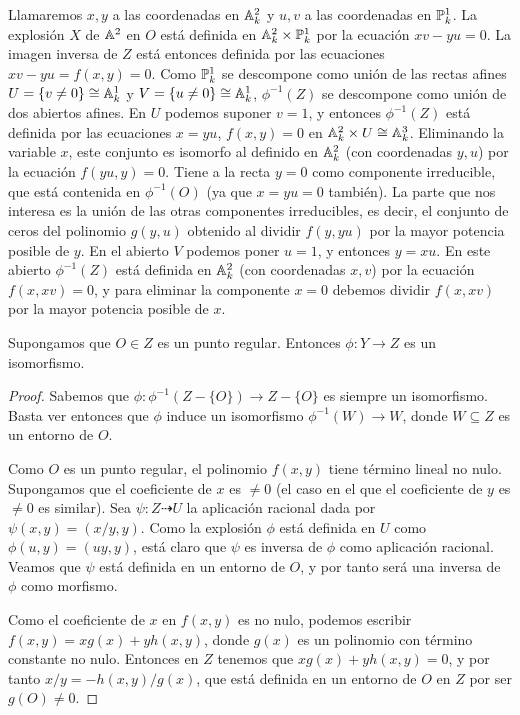 \documentclass[ACGA.tex]{subfiles}
\begin{document}
Llamaremos $x,y$ a las coordenadas en $\mathbb{A}^2_k$ y $u,v$ a las coordenadas en $\mathbb{P}^1_k$. La explosión $X$ de $\mathbb{A}^2$ en $O$ está definida en $\mathbb{A}^2_k\times\mathbb{P}^1_k$ por la ecuación $xv-yu=0$. La imagen inversa de $Z$ está entonces definida por las ecuaciones $xv-yu=f(x,y)=0$. Como $\mathbb{P}^1_k$ se descompone como unión de las rectas afines $U=\{v\neq 0\}\cong\mathbb{A}^1_k$ y $V=\{u\neq 0\}\cong\mathbb{A}^1_k$, $\phi^{-1}(Z)$ se descompone como unión de dos abiertos afines. En $U$ podemos suponer $v=1$, y entonces $\phi^{-1}(Z)$ está definida por las ecuaciones $x=yu$, $f(x,y)=0$ en $\mathbb{A}^2_k\times U\cong\mathbb{A}^3_k$. Eliminando la variable $x$, este conjunto es isomorfo al definido en $\mathbb{A}^2_k$ (con coordenadas $y,u$) por la ecuación $f(yu,y)=0$. Tiene a la recta $y=0$ como componente irreducible, que está contenida en $\phi^{-1}(O)$ (ya que $x=yu=0$ también). La parte que nos interesa es la unión de las otras componentes irreducibles, es decir, el conjunto de ceros del polinomio $g(y,u)$ obtenido al dividir $f(y,yu)$ por la mayor potencia posible de $y$.
 En el abierto $V$ podemos poner $u=1$, y entonces $y=xu$. En este abierto $\phi^{-1}(Z)$ está definida en $\mathbb{A}^2_k$ (con coordenadas $x,v$) por la ecuación $f(x,xv)=0$, y para eliminar la componente $x=0$ debemos dividir $f(x,xv)$ por la mayor potencia posible de $x$. 

\begin{prop}
 Supongamos que $O\in Z$ es un punto regular. Entonces $\phi:Y\to Z$ es un isomorfismo.
\end{prop}

\begin{proof}
 Sabemos que $\phi:\phi^{-1}(Z-\{O\})\to Z-\{O\}$ es siempre un isomorfismo. Basta ver entonces que $\phi$ induce un isomorfismo $\phi^{-1}(W)\to W$, donde $W\subseteq Z$ es un entorno de $O$. 

Como $O$ es un punto regular, el polinomio $f(x,y)$ tiene término lineal no nulo. Supongamos que el coeficiente de $x$ es $\neq 0$ (el caso en el que el coeficiente de $y$ es $\neq 0$ es similar). Sea $\psi:Z\dashrightarrow U$ la aplicación racional dada por $\psi(x,y)=(x/y,y)$. Como la explosión $\phi$ está definida en $U$ como $\phi(u,y)=(uy,y)$, está claro que $\psi$ es inversa de $\phi$ como aplicación racional. Veamos que $\psi$ está definida en un entorno de $O$, y por tanto será una inversa de $\phi$ como morfismo.

Como el coeficiente de $x$ en $f(x,y)$ es no nulo, podemos escribir $f(x,y)=xg(x)+yh(x,y)$, donde $g(x)$ es un polinomio con término constante no nulo. Entonces en $Z$ tenemos que $xg(x)+yh(x,y)=0$, y por tanto $x/y=-h(x,y)/g(x)$, que está definida en un entorno de $O$ en $Z$ por ser $g(O)\neq 0$.
\end{proof}  
\end{document}
